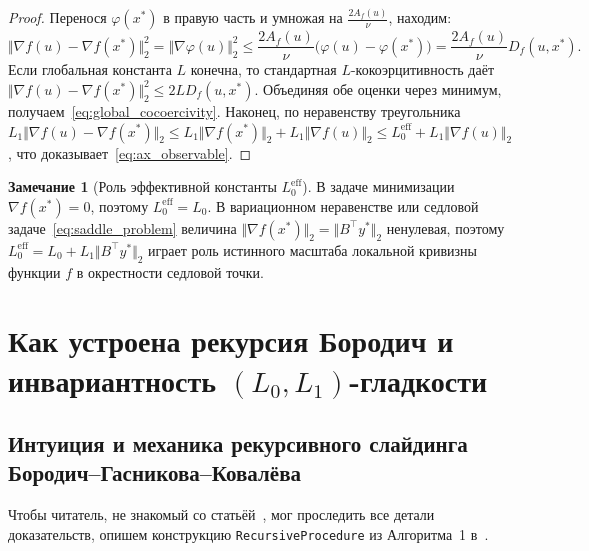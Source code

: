 \documentclass[11pt, a4paper]{article}
\theoremstyle{definition}
\newtheorem{remark}{Замечание}[section]
\begin{document}
\begin{proof}
Перенося $\varphi(x^*)$ в правую часть и умножая на $\frac{2 A_f(u)}{\nu}$, находим:
\[
\Vert \nabla f(u) - \nabla f(x^*) \Vert_2^2 = \Vert \nabla \varphi(u) \Vert_2^2 \le \frac{2 A_f(u)}{\nu} \big(\varphi(u) - \varphi(x^*)\big) = \frac{2 A_f(u)}{\nu} D_f(u, x^*).
\]
Если глобальная константа $L$ конечна, то стандартная $L$-кокоэрцитивность даёт $\Vert \nabla f(u) - \nabla f(x^*) \Vert_2^2 \le 2 L D_f(u, x^*)$. Объединяя обе оценки через минимум, получаем~\eqref{eq:global_cocoercivity}. Наконец, по неравенству треугольника $L_1 \Vert \nabla f(u) - \nabla f(x^*) \Vert_2 \le L_1 \Vert \nabla f(x^*) \Vert_2 + L_1 \Vert \nabla f(u) \Vert_2 \le L_0^{\mathrm{eff}} + L_1 \Vert \nabla f(u) \Vert_2$, что доказывает~\eqref{eq:ax_observable}.
\end{proof}

\begin{remark}[Роль эффективной константы $L_0^{\mathrm{eff}}$]\label{rem:l0_eff}
В задаче минимизации $\nabla f(x^*) = 0$, поэтому $L_0^{\mathrm{eff}} = L_0$. В вариационном неравенстве или седловой задаче~\eqref{eq:saddle_problem} величина $\Vert \nabla f(x^*) \Vert_2 = \Vert B^\top y^* \Vert_2$ ненулевая, поэтому $L_0^{\mathrm{eff}} = L_0 + L_1 \Vert B^\top y^* \Vert_2$ играет роль истинного масштаба локальной кривизны функции $f$ в окрестности седловой точки.
\end{remark}

\section{Как устроена рекурсия Бородич и инвариантность $(L_0, L_1)$-гладкости}

\subsection{Интуиция и механика рекурсивного слайдинга Бородич--Гасникова--Ковалёва}

Чтобы читатель, не знакомый со статьёй~\cite{Borodich2025}, мог проследить все детали доказательств, опишем конструкцию \texttt{RecursiveProcedure} из Алгоритма~1 в~\cite{Borodich2025}.
\end{document}
